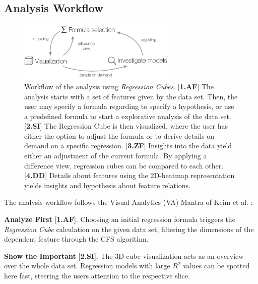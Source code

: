 \documentclass[journal]{style/vgtc} 			          %
\newcommand{\com}[1]{\textcolor{orange}{\uline{#1}}}
\begin{document}
\subsection{Analysis Workflow}
\begin{figure}[htb]
 \centering
 \includegraphics[width=3.0in]{figures/workflow}
 \caption{
 Workflow of the analysis using \emph{Regression Cubes}.
 [\textbf{1.AF}] The analysis starts with a set of features given by the data set.
 Then, the user may specify a formula regarding to specify a hypothesis, or use a predefined formula to start a explorative analysis of the data set.
 [\textbf{2.SI}] The Regression Cube is then visualized, where the user has either the option to adjust the formula or to derive details on demand on a specific regression.
 [\textbf{3.ZF}] Insights into the data yield either an adjustment of the current formula.
 By applying a difference view, regression cubes can be compared to each other.
 [\textbf{4.DD}] Details about features using the 2D-heatmap representation yields insights and hypothesis about feature relations.
 }
  \label{fig:Workflow}
\end{figure}
The analysis workflow follows the Visual Analytics (VA) Mantra of Keim et al. \cite{Keim}:

\textbf{Analyze First} [\textbf{1.AF}]. Choosing an initial regression formula triggers the \emph{Regression Cube} calculation on the given data set, filtering the dimensions of the dependent feature through the CFS algorithm.

\textbf{Show the Important} [\textbf{2.SI}]. The 3D-cube visualization acts as an overview over the whole data set.
Regression models with large $R^2$ values can be spotted here fast, steering the users attention to the respective slice.
\end{document}
